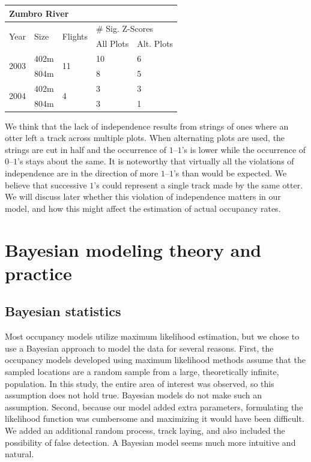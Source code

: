 \documentclass[12pt]{article}
\begin{document}
\begin{table}
    \begin{center}
    \begin{tabular}{|l|l|l|l|l|}
        \hline
        \multicolumn{5}{|l|}{\textbf{Zumbro River}} \\
        \hline
        \multirow{2}{*}{Year} & \multirow{2}{*}{Size} & \multirow{2}{*}{Flights}
        & \multicolumn{2}{|l|}{\# Sig. Z-Scores} \\
        \cline{4-5}
        & & & All Plots & Alt. Plots \\
        \hline
        \multirow{2}{*}{2003} & 402m & \multirow{2}{*}{11} & 10 & 6 \\
        \cline{2-2} \cline{4-5}
        & 804m & & 8 & 5 \\
        \hline
        \multirow{2}{*}{2004} & 402m & \multirow{2}{*}{4} & 3 & 3 \\
        \cline{2-2} \cline{4-5}
        & 804m & & 3 & 1 \\
        \hline
    \end{tabular}
    \end{center}
    \end{table}

    We think that the lack of independence results from strings of ones where an
    otter left a track across multiple plots. When alternating plots are used,
    the strings are cut in half and the occurrence of \(1\)--\(1\)'s is lower
    while the occurrence of \(0\)--\(1\)'s stays about the same. It is
    noteworthy that virtually all the violations of independence are in the
    direction of more \(1\)--\(1\)'s than would be expected. We believe that
    successive \(1\)'s could represent a single track made by the same otter. We
    will
    discuss later whether this violation of independence matters in our
    model, and how this might affect the estimation of actual occupancy rates.

\section{Bayesian modeling theory and practice}

    \subsection{Bayesian statistics}
    Most occupancy models utilize maximum likelihood estimation, but we chose
    to use a Bayesian approach to model the data for several reasons.
    First, the occupancy models developed using maximum likelihood methods
    assume that the sampled locations are a random sample from a large,
    theoretically infinite, population.  In this study, the entire area of
    interest was observed, so this assumption does not hold true.  Bayesian
    models do not make such an assumption.  Second, because our model added
    extra
    parameters, formulating the likelihood function was cumbersome and
    maximizing
    it would have been difficult.  We added an additional random process, track
    laying, and also included the possibility of false detection.  A Bayesian
    model seems much more intuitive and natural.
\end{document}
